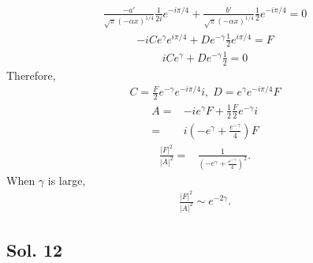 \begin{align*}
    \frac{-a'}{\sqrt{\pi}(-\alpha x)^{1/4}}
    \frac{1}{2i}e^{-i\pi /4}
    +
    \frac{b'}{\sqrt{\pi}(-\alpha x)^{1/4}}
    \frac{1}{2}e^{-i\pi /4}=0
\end{align*}
\begin{align*}
    -iCe^\gamma
    e^{i\pi /4}
    +
    De^{-\gamma}
    \frac{1}{2}e^{i\pi /4}=
    F
\end{align*}
\begin{align*}
    i
    Ce^{\gamma}
    +
    De^{-\gamma}
    \frac{1}{2}=0
\end{align*}
Therefore,
\begin{align*}
    C = \frac{F}{2}e^{-\gamma}e^{-i\pi/4}i,\;
    D = e^\gamma e^{-i\pi/4}F
\end{align*}
\begin{align*}
    A = &-ie^\gamma F + \frac{1}{2}\frac{F}{2}e^{-\gamma}i\\
    =&i\left(-e^\gamma + \frac{e^{-\gamma}}{4}\right)F
\end{align*}
\begin{align*}
    \frac{|F|^2}{|A|^2}
    =&\frac{1}{\left(-e^\gamma + \frac{e^{-\gamma}}{4}\right)^2}.
\end{align*}
When $\gamma$ is large,
\begin{align*}
    \frac{|F|^2}{|A|^2}\sim e^{-2\gamma}.
\end{align*}
\subsection*{Sol. 12}

